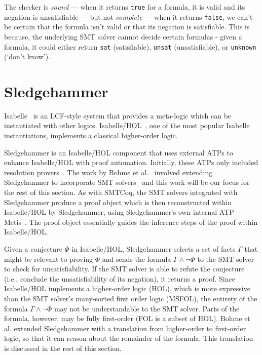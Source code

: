 \documentclass{article}
\begin{document}
	The checker is \textit{sound} ---
	when it returns \texttt{true} for 
	a formula, it is valid and its 
	negation is unsatisfiable --- but 
	not \textit{complete} --- when it 
	returns \texttt{false}, we can't be 
	certain that the formula isn't valid
	or that its negation is satisfiable.
	This is because, the underlying SMT 
	solver 
	cannot decide certain formulas -
	given a formula, it could either 
	return \texttt{sat} 
	(satisfiable), \texttt{unsat} 
	(unsatisfiable), or 
	\texttt{unknown} (`don't know').

	
\section{Sledgehammer}
\label{sec:hammer}
	Isabelle~\cite{DBLP:journals/corr/cs-LO-9301106} 
	is an LCF-style system that 
	provides a meta-logic which can be 
	instantiated with other logics.
	Isabelle/HOL~\cite{10.5555/1791547}, 
	one of the most popular Isabelle 
	instantiations, implements a 
	classical higher-order logic. 
	
	Sledgehammer is
	an Isabelle/HOL component that 
	uses external ATPs to enhance 
	Isabelle/HOL with proof 
	automation. Initially, these 
	ATPs only included resolution 
	provers~\cite{10.1007/978-3-642-39799-8_1}.
	The work by Bohme et 
	al.~\cite{bohme} involved 
	extending Sledgehammer to 
	incorporate SMT
	solvers~\cite{Barrett2018} and this 
	work will be our focus for the 
	rest of this section. As with 
	SMTCoq, the SMT solvers integrated
	with Sledgehammer produce a 
	proof object which is 
	then reconstructed within
	Isabelle/HOL by Sledgehammer, 
	using Sledgehammer's own internal 
	ATP --- Metis~\cite{hurd2003d}. The 
	proof object essentially guides 
	the inference steps of the proof 
	within Isabelle/HOL.
	
	Given a conjecture $\Phi$ in 
	Isabelle/HOL, Sledgehammer 
	selects a set of facts 
	$\Gamma$ that might be relevant 
	to proving $\Phi$ and sends
	the formula $\Gamma \land \neg 
	\Phi$ to the SMT solver to check 
	for unsatisfiability. If the SMT 
	solver is able to refute the 
	conjecture (i.e., conclude 
	the unsatisfiability of its 
	negation), it returns 
	a proof. Since Isabelle/HOL 
	implements a higher-order logic 
	(HOL), which 
	is more expressive than 
	the SMT solver's many-sorted
	first order logic (MSFOL),
	the entirety of the formula
	$\Gamma \land \neg \Phi$ may not 
	be understandable to the SMT 
	solver. Parts of the formula,
	however, may be fully 
	first-order (FOL is 
	a subset of HOL). Bohme et al.
	extended Sledgehammer with 
	a translation from higher-order 
	to first-order logic, so that 
	it can reason about the remainder
	of the formula. This translation
	is discussed in the rest of this 
	section.
	
\end{document}

